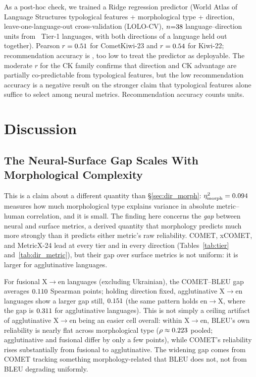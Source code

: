 \documentclass[11pt]{article}
\begin{document}
As a post-hoc check, we trained a Ridge regression predictor (World Atlas of Language Structures \citep[WALS;][]{wals} typological features + morphological type + direction, leave-one-language-out cross-validation (LOLO-CV), $n{=}38$ language--direction units from \RidgeNLangs\ Tier-1 languages, with both directions of a language held out together). Pearson $r=0.51$ for CometKiwi-23 and $r=0.54$ for Kiwi-22; recommendation accuracy is \RidgeRecAcc, too low to treat the predictor as deployable. The moderate $r$ for the CK family confirms that direction and CK advantage are partially co-predictable from typological features, but the low recommendation accuracy is a negative result on the stronger claim that typological features alone suffice to select among neural metrics. Recommendation accuracy counts units.

\section{Discussion}
\label{sec:discussion}

\subsection{The Neural-Surface Gap Scales With Morphological Complexity}

This is a claim about a different quantity than \S\ref{sec:dir_morph}: $\eta^2_{\text{morph}}=0.094$ measures how much morphological type explains variance in absolute metric--human correlation, and it is small. The finding here concerns the \emph{gap} between neural and surface metrics, a derived quantity that morphology predicts much more strongly than it predicts either metric's raw reliability. COMET, xCOMET, and MetricX-24 lead at every tier and in every direction (Tables~\ref{tab:tier} and~\ref{tab:dir_metric}), but their gap over surface metrics is not uniform: it is larger for agglutinative languages.

For fusional X$\to$en languages (excluding Ukrainian), the COMET--BLEU gap averages $0.110$ Spearman points; holding direction fixed, agglutinative X$\to$en languages show a larger gap still, $0.151$ (the same pattern holds en$\to$X, where the gap is $0.311$ for agglutinative languages). This is not simply a ceiling artifact of agglutinative X$\to$en being an easier cell overall: within X$\to$en, BLEU's own reliability is nearly flat across morphological type ($\rho\approx0.223$ pooled; agglutinative and fusional differ by only a few points), while COMET's reliability rises substantially from fusional to agglutinative. The widening gap comes from COMET tracking something morphology-related that BLEU does not, not from BLEU degrading uniformly.
\end{document}
